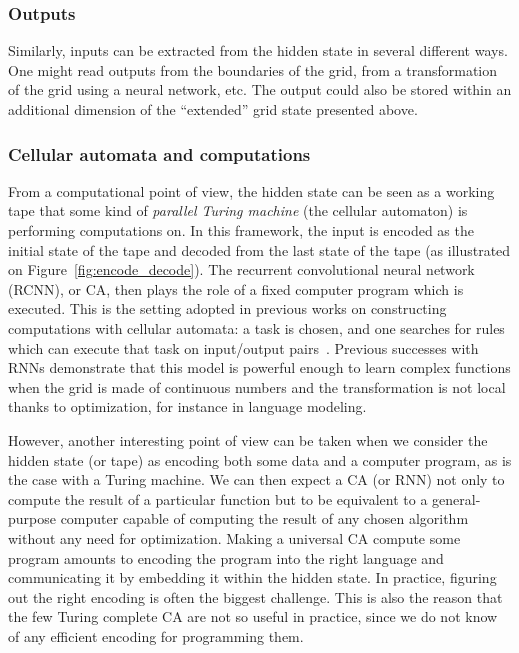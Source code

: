 \subsubsection{Outputs}

Similarly, inputs can be extracted from the hidden state in several different
ways. One might read outputs from the boundaries of the grid, from a
transformation of the grid using a neural network, etc. The output could also be
stored within an additional dimension of the ``extended'' grid state presented
above.

\subsubsection{Cellular automata and computations}

From a computational point of view, the hidden state can be seen as a working
tape that some kind of \emph{parallel Turing machine} (the cellular automaton)
is performing computations on. In this framework, the input is encoded as the
initial state of the tape and decoded from the last state of the tape (as
illustrated on Figure~\ref{fig:encode_decode}). The recurrent convolutional
neural network (RCNN), or \ac{CA}, then plays the role of a fixed computer
program which is executed. This is the setting adopted in previous works on
constructing computations with cellular automata: a task is chosen, and one
searches for rules which can execute that task on input/output
pairs~\parencite{mitchellComputationCellularAutomata2005}. Previous successes
with \acp{RNN} demonstrate that this model is powerful enough to learn complex
functions when the grid is made of continuous numbers and the transformation is
not local thanks to optimization, for instance in language modeling.

However, another interesting point of view can be taken when we consider the
hidden state (or tape) as encoding both some data and a computer program, as is
the case with a Turing machine. We can then expect a \ac{CA} (or \ac{RNN}) not
only to compute the result of a particular function but to be equivalent to a
general-purpose computer capable of computing the result of any chosen algorithm
without any need for optimization. Making a universal \ac{CA} compute some
program amounts to encoding the program into the right language and
communicating it by embedding it within the hidden state. In practice, figuring
out the right encoding is often the biggest challenge. This is also the reason
that the few Turing complete \ac{CA} are not so useful in practice, since we do
not know of any efficient encoding for programming them.

